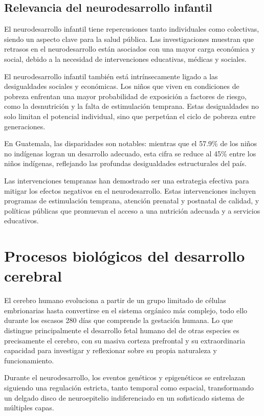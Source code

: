 \documentclass[11pt,letterpaper]{report}
\begin{document}
\subsection{Relevancia del neurodesarrollo infantil}
El neurodesarrollo infantil tiene repercusiones tanto individuales como
colectivas, siendo un aspecto clave para la salud pública. Las investigaciones
muestran que retrasos en el neurodesarrollo están asociados con una mayor carga
económica y social, debido a la necesidad de intervenciones educativas, médicas
y sociales.

El neurodesarrollo infantil también está intrínsecamente ligado a las 
desigualdades sociales y económicas. Los niños que viven en condiciones de 
pobreza enfrentan una mayor probabilidad de exposición a factores de riesgo, 
como la desnutrición y la falta de estimulación temprana. Estas desigualdades 
no solo limitan el potencial individual, sino que perpetúan el ciclo de pobreza 
entre generaciones. \cite{UNICEF2023}

En Guatemala, las disparidades son notables: mientras que el 57.9\% de los
niños no indígenas logran un desarrollo adecuado, esta cifra se reduce al 45\%
entre los niños indígenas, reflejando las profundas desigualdades estructurales
del país. \cite{SESAN2022}

Las intervenciones tempranas han demostrado ser una estrategia efectiva para 
mitigar los efectos negativos en el neurodesarrollo. Estas intervenciones
incluyen programas de estimulación temprana, atención prenatal y postnatal de
calidad, y políticas públicas que promuevan el acceso a una nutrición adecuada
y a servicios educativos.


\section{Procesos biológicos del desarrollo cerebral}
El cerebro humano evoluciona a partir de un grupo limitado de células
embrionarias hasta convertirse en el sistema orgánico más complejo, todo ello
durante los escasos 280 días que comprende la gestación humana. Lo que 
distingue principalmente el desarrollo fetal humano del de otras especies es 
precisamente el cerebro, con su masiva corteza prefrontal y su extraordinaria 
capacidad para investigar y reflexionar sobre su propia naturaleza y 
funcionamiento. \cite{Polin124}

Durante el neurodesarrollo, los eventos genéticos y epigenéticos se entrelazan 
siguiendo una regulación estricta, tanto temporal como espacial, transformando
un delgado disco de neuroepitelio indiferenciado en un sofisticado sistema de
múltiples capas. \cite{Polin124}
\end{document}
